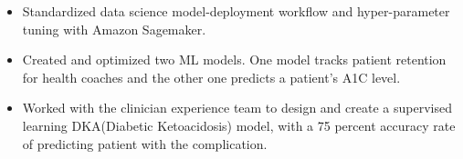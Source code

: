 \documentclass[10pt,a4paper,ragged2e,withhyper]{altacv}
\begin{document}
\begin{paracol}{2}
  \begin{itemize}
    \item Standardized data science model-deployment workflow and hyper-parameter tuning with Amazon Sagemaker.
    \item Created and optimized two ML models. One model tracks patient retention for health coaches and the other one predicts a patient’s A1C level.
    \item Worked with the clinician experience team to design and create a supervised learning DKA(Diabetic Ketoacidosis) model, with a 75 percent accuracy rate of predicting patient with the complication.
  \end{itemize}
\end{paracol}
\end{document}
